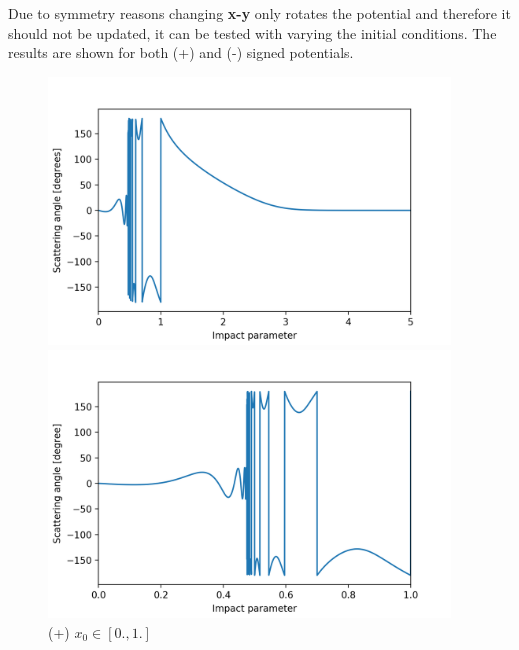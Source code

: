 \documentclass[a4paper,12pt]{article}
\begin{document}
\par Due to symmetry reasons changing \textbf{x-y} only rotates the potential and therefore
it should not be updated, it can be tested with varying the initial conditions. The results
are shown for both (+) and (-) signed potentials.

\begin{figure}[H]
	\centering
	\begin{minipage}{0.5\textwidth}
		\centering
		\includegraphics[width=0.95\textwidth]{./chaotic-scattering-co1.png}
		\caption{ (+) $x_{0} \in [0., 5.]$ }
	\end{minipage}\hfill
	\begin{minipage}{0.5\textwidth}
		\centering
		\includegraphics[width=0.95\textwidth]{./chaotic-scattering-co2.png}
		\caption{ (+) $x_{0} \in [0., 1.]$}
	\end{minipage}
\end{figure}
\end{document}
